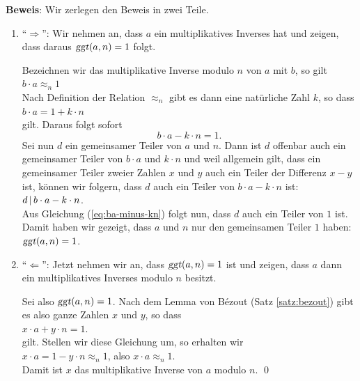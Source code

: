 \noindent
\textbf{Beweis}: Wir zerlegen den Beweis in zwei Teile.
\begin{enumerate}
\item ``$\Rightarrow$'':  Wir nehmen an, dass $a$ ein multiplikatives Inverses hat und zeigen,
      dass daraus $\textsl{ggt}(a,n) = 1$ folgt.

      Bezeichnen wir das multiplikative Inverse modulo $n$ von $a$ mit $b$, so gilt
      \\[0.2cm]
      \hspace*{1.3cm}
      $b \cdot a \approx_n 1$
      \\[0.2cm]
      Nach Definition der Relation $\approx_n$ gibt es dann eine nat\"{u}rliche Zahl $k$, so dass
      \\[0.2cm]
      \hspace*{1.3cm}
      $b \cdot a = 1 + k \cdot n$
      \\[0.2cm]
      gilt.  Daraus folgt sofort
      \begin{equation}
        \label{eq:ba-minus-kn}
      b \cdot a - k \cdot n = 1.         
      \end{equation}
      Sei nun $d$ ein gemeinsamer Teiler von $a$ und $n$.  Dann ist $d$ offenbar auch ein
      gemeinsamer Teiler von $b \cdot a$ und $k \cdot n$ und weil allgemein gilt, dass ein
      gemeinsamer Teiler zweier Zahlen $x$ und $y$ auch ein Teiler der Differenz $x - y$ ist, 
      k\"{o}nnen wir folgern, dass $d$ auch ein Teiler von $b \cdot a - k \cdot n$ ist:
      \\[0.2cm]
      \hspace*{1.3cm}
      $d \,|\, b \cdot a - k \cdot n$.
      \\[0.2cm]
      Aus Gleichung (\ref{eq:ba-minus-kn}) folgt nun, dass $d$ auch ein Teiler von $1$ ist.
      Damit haben wir gezeigt, dass $a$ und $n$ nur den gemeinsamen Teiler $1$ haben:
      \\[0.2cm]
      \hspace*{1.3cm}
      $\textsl{ggt}(a, n) = 1$.
\item ``$\Leftarrow$'': Jetzt nehmen wir an, dass $\textsl{ggt}(a, n) = 1$ ist und zeigen, dass
      $a$ dann ein multiplikatives Inverses modulo $n$ besitzt.

      Sei also $\textsl{ggt}(a, n) = 1$.  Nach dem Lemma von B\'{e}zout (Satz \ref{satz:bezout})
      gibt es also ganze Zahlen $x$ und $y$, so dass 
      \\[0.2cm]
      \hspace*{1.3cm}
      $x \cdot a + y \cdot n = 1$.
      \\[0.2cm]
      gilt. Stellen wir diese Gleichung um, so erhalten wir
      \\[0.2cm]
      \hspace*{1.3cm}
      $x \cdot a = 1 - y \cdot n \approx_n 1$, \quad also $x \cdot a \approx_n 1$.
      \\[0.2cm]
      Damit ist $x$ das multiplikative Inverse von $a$ modulo $n$. \qed
\end{enumerate}


